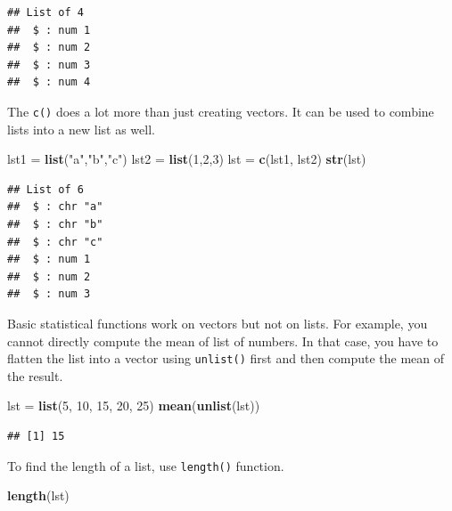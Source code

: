 \documentclass[
]{book}
\newenvironment{Shaded}{\begin{snugshade}}{\end{snugshade}}
\newcommand{\DecValTok}[1]{\textcolor[rgb]{0.00,0.00,0.81}{#1}}
\newcommand{\KeywordTok}[1]{\textcolor[rgb]{0.13,0.29,0.53}{\textbf{#1}}}
\newcommand{\NormalTok}[1]{#1}
\newcommand{\StringTok}[1]{\textcolor[rgb]{0.31,0.60,0.02}{#1}}
\begin{document}
\begin{verbatim}
## List of 4
##  $ : num 1
##  $ : num 2
##  $ : num 3
##  $ : num 4
\end{verbatim}

The \texttt{c()} does a lot more than just creating vectors. It can be used to combine lists into a new list as well.

\begin{Shaded}
\begin{Highlighting}[]
\NormalTok{lst1 =}\StringTok{ }\KeywordTok{list}\NormalTok{(}\StringTok{"a"}\NormalTok{,}\StringTok{"b"}\NormalTok{,}\StringTok{"c"}\NormalTok{)}
\NormalTok{lst2 =}\StringTok{ }\KeywordTok{list}\NormalTok{(}\DecValTok{1}\NormalTok{,}\DecValTok{2}\NormalTok{,}\DecValTok{3}\NormalTok{)}
\NormalTok{lst =}\StringTok{ }\KeywordTok{c}\NormalTok{(lst1, lst2)}
\KeywordTok{str}\NormalTok{(lst)}
\end{Highlighting}
\end{Shaded}

\begin{verbatim}
## List of 6
##  $ : chr "a"
##  $ : chr "b"
##  $ : chr "c"
##  $ : num 1
##  $ : num 2
##  $ : num 3
\end{verbatim}

Basic statistical functions work on vectors but not on lists. For example, you cannot directly compute the mean of list of numbers. In that case, you have to flatten the list into a vector using \texttt{unlist()} first and then compute the mean of the result.

\begin{Shaded}
\begin{Highlighting}[]
\NormalTok{lst =}\StringTok{ }\KeywordTok{list}\NormalTok{(}\DecValTok{5}\NormalTok{, }\DecValTok{10}\NormalTok{, }\DecValTok{15}\NormalTok{, }\DecValTok{20}\NormalTok{, }\DecValTok{25}\NormalTok{)}
\KeywordTok{mean}\NormalTok{(}\KeywordTok{unlist}\NormalTok{(lst))}
\end{Highlighting}
\end{Shaded}

\begin{verbatim}
## [1] 15
\end{verbatim}

To find the length of a list, use \texttt{length()} function.

\begin{Shaded}
\begin{Highlighting}[]
\KeywordTok{length}\NormalTok{(lst)}
\end{Highlighting}
\end{Shaded}
\end{document}
